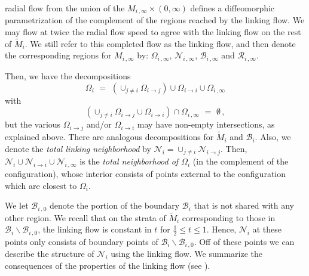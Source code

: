 \documentclass[10pt]{amsart}
\theoremstyle{definition}
\theoremstyle{definition}
\numberwithin{equation}{section}
\def \cB {\mathcal{B}}
\def \cN {\mathcal{N}}
\def \cR {\mathcal{R}}
\def \gW {\Omega}
\begin{document}
radial flow from the union of the $M_{i\, ,\infty} \times (0, \infty)$ 
defines a diffeomorphic parametrization of the complement of the regions 
reached by the linking flow.  We may flow at twice the radial flow speed 
to agree with the linking flow on the rest of $\tilde M_i$.  We still refer 
to this completed flow as the linking flow, and then denote the 
corresponding regions for $M_{i\, ,\infty}$ by: $\gW_{i\, ,\infty}$, 
$\cN_{i\, ,\infty}$,  $\cB_{i\, ,\infty}$ and $\cR_{i\, ,\infty}$. \par
Then, we have the decompositions 
\begin{equation}
\label{EqnII4.2}
\gW_i \,\, =\,\,  (\cup_{j \neq i} \gW_{i \to j}) \cup \gW_{i \to i} \cup 
\gW_{i\, ,\infty}
\end{equation}
\noindent with
\begin{equation*} (\cup_{j \neq i} \gW_{i \to j} 
\cup \gW_{i \to i}) \cap \gW_{i\, ,\infty} \,\, =\,\,  \emptyset \, ,
\end{equation*} 
but the various $\gW_{i \to j}$ and/or $\gW_{i \to i}$ may have 
non-empty intersections, as explained above.  There are analogous 
decompositions for $\tilde M_i$ and $\cB_i$.  Also, we denote the {\it 
total linking neighborhood} by $\cN_i = \cup_{j \neq i} \cN_{i \to j}$.
Then, $\cN_i \cup \cN_{i \to i} \cup \cN_{i\, ,\infty}$ is the {\it total 
neighborhood of $\gW_i$} (in the complement of the configuration), whose 
interior consists of points external to the configuration which are closest 
to $\gW_i$.  \par 
We let $\cB_{i\, ,0}$ denote the portion of 
the boundary $\cB_i$ that is not shared with any other region.  We recall 
that on 
the strata of $\tilde M_i$ corresponding to those in $\cB_i\backslash 
\cB_{i\, ,0}$, the linking flow is constant in $t$ for $\frac{1}{2} \leq t 
\leq 1$.  Hence, $\cN_i$ at these points only consists of boundary points 
of $\cB_i\backslash \cB_{i\, ,0}$.  Off of these points we can describe the 
structure of $\cN_i$ using the linking flow. 
We summarize the  consequences of the properties of the linking flow (see 
\cite[Cor. 9.2]{DG}).  
\par
\end{document}
